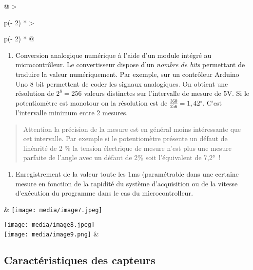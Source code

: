 \documentclass[
]{article}
\begin{document}
\begin{longtable}[]{@{}
  >{\raggedright\arraybackslash}p{(\columnwidth - 2\tabcolsep) * }
  >{\raggedright\arraybackslash}p{(\columnwidth - 2\tabcolsep) * }@{}}
\toprule
\begin{minipage}[b]{\linewidth}\raggedright
\begin{enumerate}
\def\labelenumi{\arabic{enumi}.}
\item
  Conversion analogique numérique à l'aide d'un module intégré au
  microcontrôleur. Le convertisseur dispose d'un \emph{nombre de bits}
  permettant de traduire la valeur numériquement. Par exemple, sur un
  contrôleur Arduino Uno 8 bit permettent de coder les signaux
  analogiques. On obtient une résolution de \(2^{8} = 256\) valeurs
  distinctes sur l'intervalle de mesure de 5V. Si le potentiomètre est
  monotour on la résolution est de \(\frac{360}{256} = 1,42{^\circ}\).
  C'est l'intervalle minimum entre 2 mesures.
\end{enumerate}

\begin{quote}
Attention la précision de la mesure est en général moins intéressante
que cet intervalle. Par exemple si le potentiomètre présente un défaut
de linéarité de 2 \% la tension électrique de mesure n'est plus une
mesure parfaite de l'angle avec un défaut de 2\% soit l'équivalent de
7,2°~!
\end{quote}

\begin{enumerate}
\def\labelenumi{\arabic{enumi}.}
\setcounter{enumi}{1}
\item
  Enregistrement de la valeur toute les 1ms (paramétrable dans une
  certaine mesure en fonction de la rapidité du système d'acquisition ou
  de la vitesse d'exécution du programme dans le cas du
  microcontrolleur.
\end{enumerate}
\end{minipage} &
\texttt{[image: media/image7.jpeg]}

\texttt{[image: media/image8.jpeg]} \\
\midrule
\endhead
\texttt{[image: media/image9.png]}
& \\
\bottomrule
\end{longtable}

\hypertarget{caractuxe9ristiques-des-capteurs}{%
\subsection{Caractéristiques des
capteurs}\label{caractuxe9ristiques-des-capteurs}}
\end{document}

